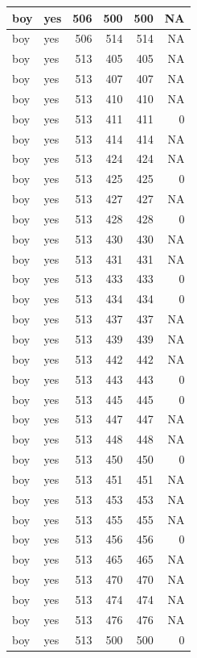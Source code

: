 \documentclass[man]{apa6}
\begin{document}
\begin{tabular}{l|l|r|r|r|r}
\hline
boy & yes & 506 & 500 & 500 & NA\\
\hline
boy & yes & 506 & 514 & 514 & NA\\
\hline
boy & yes & 513 & 405 & 405 & NA\\
\hline
boy & yes & 513 & 407 & 407 & NA\\
\hline
boy & yes & 513 & 410 & 410 & NA\\
\hline
boy & yes & 513 & 411 & 411 & 0\\
\hline
boy & yes & 513 & 414 & 414 & NA\\
\hline
boy & yes & 513 & 424 & 424 & NA\\
\hline
boy & yes & 513 & 425 & 425 & 0\\
\hline
boy & yes & 513 & 427 & 427 & NA\\
\hline
boy & yes & 513 & 428 & 428 & 0\\
\hline
boy & yes & 513 & 430 & 430 & NA\\
\hline
boy & yes & 513 & 431 & 431 & NA\\
\hline
boy & yes & 513 & 433 & 433 & 0\\
\hline
boy & yes & 513 & 434 & 434 & 0\\
\hline
boy & yes & 513 & 437 & 437 & NA\\
\hline
boy & yes & 513 & 439 & 439 & NA\\
\hline
boy & yes & 513 & 442 & 442 & NA\\
\hline
boy & yes & 513 & 443 & 443 & 0\\
\hline
boy & yes & 513 & 445 & 445 & 0\\
\hline
boy & yes & 513 & 447 & 447 & NA\\
\hline
boy & yes & 513 & 448 & 448 & NA\\
\hline
boy & yes & 513 & 450 & 450 & 0\\
\hline
boy & yes & 513 & 451 & 451 & NA\\
\hline
boy & yes & 513 & 453 & 453 & NA\\
\hline
boy & yes & 513 & 455 & 455 & NA\\
\hline
boy & yes & 513 & 456 & 456 & 0\\
\hline
boy & yes & 513 & 465 & 465 & NA\\
\hline
boy & yes & 513 & 470 & 470 & NA\\
\hline
boy & yes & 513 & 474 & 474 & NA\\
\hline
boy & yes & 513 & 476 & 476 & NA\\
\hline
boy & yes & 513 & 500 & 500 & 0\\

\end{tabular}
\end{document}
